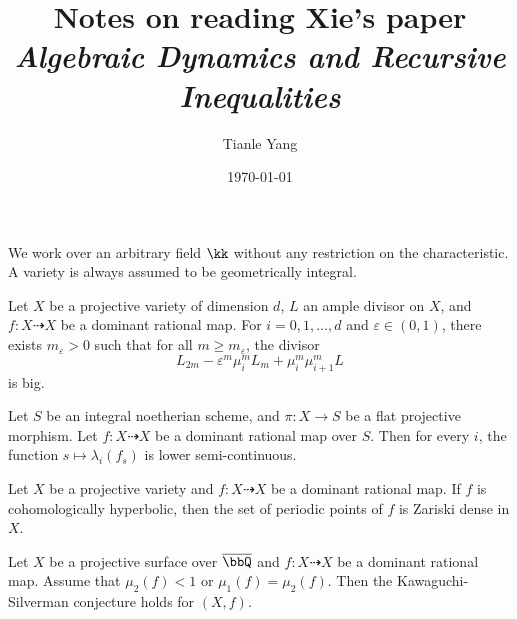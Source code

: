 \documentclass[sectionlevel=chapter]{noteformyself}
\title{Notes on reading Xie's paper \textit{Algebraic Dynamics and Recursive Inequalities}}
\author{Tianle Yang}
\date{\today}
\newcommand{\Yang}[1]{\textcolor{red}{Yang: #1}}
\begin{document}
\maketitle

\tableofcontents

\vspace{2em}

We work over an arbitrary field $\kk$ without any restriction on the characteristic.
A variety is always assumed to be geometrically integral.

\begin{mainthm}[{= \cref{thm:big_inequality_by_mu_i}, ref. \cite[Theorem 3.7]{Xie24recursive_inequalities}}]\label{mainthm:recursive_inequality}
	Let $X$ be a projective variety of dimension $d$, $L$ an ample divisor on $X$, and $f: X \dashrightarrow X$ be a dominant rational map.
	For $i = 0, 1, \ldots, d$ and $\varepsilon \in (0, 1)$, there exists $m_\varepsilon > 0$ such that for all $m \geq m_\varepsilon$, the divisor
	\[  L_{2m} - \varepsilon^m \mu_i^m L_m + \mu_i^m \mu_{i+1}^m L \]
	is big.
\end{mainthm}

\begin{mainthm}[{= \cref{thm:semi-continuity-of-dynamical-degrees}, ref. \cite[Theorem 1.8]{Xie24recursive_inequalities}}]\label{mainthm:semi-continuity}
	Let $S$ be an integral noetherian scheme, and $\pi: X \to S$ be a flat projective morphism.
	Let $f: X \dashrightarrow X$ be a dominant rational map over $S$.
	Then for every $i$, the function $s \mapsto \lambda_i(f_s)$ is lower semi-continuous.
\end{mainthm}

\begin{mainthm}[{= \cref{thm:density_of_periodic_points_for_cohomologically_hyperbolic_maps}, ref. \cite[Theorem 1.12]{Xie24recursive_inequalities}}]\label{mainthm:periodic_points}
	Let $X$ be a projective variety and $f: X \dashrightarrow X$ be a dominant rational map.
	If $f$ is cohomologically hyperbolic, then the set of periodic points of $f$ is Zariski dense in $X$.
\end{mainthm}

\begin{mainthm}[{= \Yang{}, ref. \cite[Theorem 1.14]{Xie24recursive_inequalities}}]\label{mainthm:application_to_KSC}
	Let $X$ be a projective surface over $\overline{\bbQ}$ and $f: X \dashrightarrow X$ be a dominant rational map.
	Assume that $\mu_2(f) < 1$ or $\mu_1(f) = \mu_2(f)$.
	Then the Kawaguchi-Silverman conjecture holds for $(X, f)$.
\end{mainthm}









\printbibliography[heading=bibintoc, title={References}]
\end{document}
